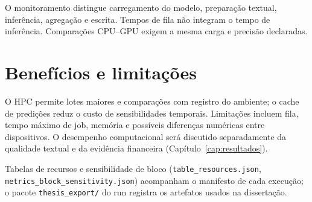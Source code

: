 O monitoramento distingue carregamento do modelo, preparação textual, inferência, agregação e escrita. Tempos de fila não integram o tempo de inferência. Comparações CPU--GPU exigem a mesma carga e precisão declaradas.

\section{Benefícios e limitações}

O HPC permite lotes maiores e comparações com registro do ambiente; o cache de predições reduz o custo de sensibilidades temporais. Limitações incluem fila, tempo máximo de job, memória e possíveis diferenças numéricas entre dispositivos. O desempenho computacional será discutido separadamente da qualidade textual e da evidência financeira (Capítulo~\ref{cap:resultados}).

Tabelas de recursos e sensibilidade de bloco (\texttt{table\_resources.json}, \texttt{metrics\_block\_sensitivity.json}) acompanham o manifesto de cada execução; o pacote \texttt{thesis\_export/} do run registra os artefatos usados na dissertação.
